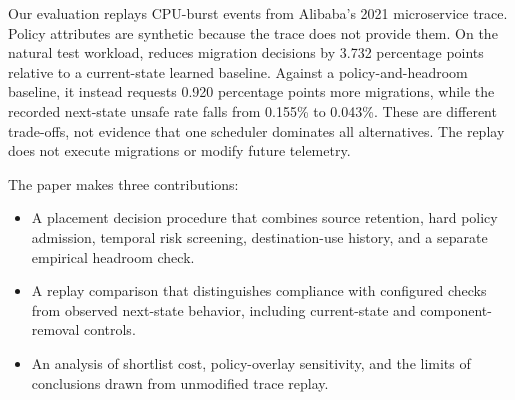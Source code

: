 Our evaluation replays CPU-burst events from Alibaba's 2021 microservice
trace. Policy attributes are synthetic because the trace does not provide
them. On the natural test workload, \cage reduces migration decisions by
3.732 percentage points relative to a current-state learned baseline.
Against a policy-and-headroom baseline, it instead requests 0.920
percentage points more migrations, while the recorded next-state unsafe
rate falls from 0.155\% to 0.043\%. These are different trade-offs, not
evidence that one scheduler dominates all alternatives. The replay does
not execute migrations or modify future telemetry.

The paper makes three contributions:
\begin{itemize}[leftmargin=*]
\item A placement decision procedure that combines source retention,
hard policy admission, temporal risk screening, destination-use history,
and a separate empirical headroom check.
\item A replay comparison that distinguishes compliance with configured
checks from observed next-state behavior, including current-state and
component-removal controls.
\item An analysis of shortlist cost, policy-overlay sensitivity, and
the limits of conclusions drawn from unmodified trace replay.
\end{itemize}
